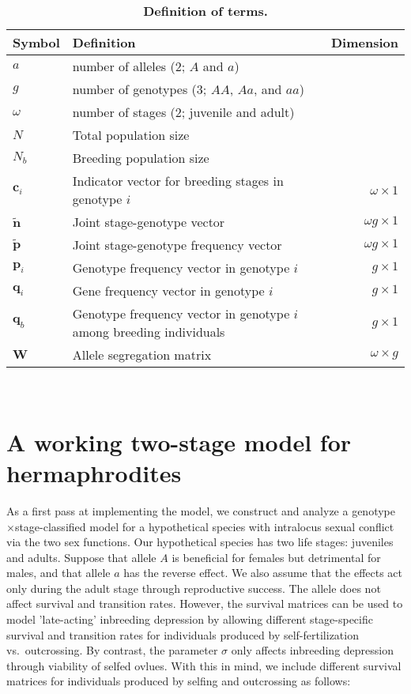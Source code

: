 \documentclass[11pt]{article}
\def\mbf#1{\mathbf{#1}}
\begin{document}
\begin{table}[htbp]
\centering
\caption{\bf Definition of terms.}
\begin{tabular}{ l l r }
 \toprule
	Symbol & Definition & Dimension \\
\hline
$a$      & number of alleles ($2$; $A$ and $a$) & \\
$g$      & number of genotypes ($3$; $AA$, $Aa$, and $aa$) & \\
$\omega$ & number of stages ($2$; juvenile and adult) & \\
$N$      & Total population size & \\
$N_b$    & Breeding population size & \\
$\mbf{c}_i$ & Indicator vector for breeding stages in genotype $i$ & $\omega \times 1$ \\
$\tilde{\mbf{n}}$ & Joint stage-genotype vector & $\omega g \times 1$ \\
$\tilde{\mbf{p}}$ & Joint stage-genotype frequency vector & $\omega g \times 1$ \\
$\mbf{p}_i$ & Genotype frequency vector in genotype $i$ & $g \times 1$ \\
$\mbf{q}_i$ & Gene frequency vector in genotype $i$ & $g \times 1$ \\
$\mbf{q}_b$ & Genotype frequency vector in genotype $i$ among breeding individuals & $g \times 1$ \\
$\mbf{W}$   & Allele segregation matrix & $\omega \times g$ \\
\hline
\end{tabular}
\label{tab:Definitions}\\
\end{table}
\newpage{}





\section*{A working two-stage model for hermaphrodites}
\setcounter{equation}{0}

As a first pass at implementing the model, we construct and analyze a genotype $\times$stage-classified model for a hypothetical species with intralocus sexual conflict via the two sex functions. Our hypothetical species has two life stages: juveniles and adults. Suppose that allele $A$ is beneficial for females but detrimental for males, and that allele $a$ has the reverse effect. We also assume that the effects act only during the adult stage through reproductive success. The allele does not affect survival and transition rates. However, the survival matrices can be used to model 'late-acting' inbreeding depression by allowing different stage-specific survival and transition rates for individuals produced by self-fertilization vs.~outcrossing. By contrast, the parameter $\sigma$ only affects inbreeding depression through viability of selfed ovlues. With this in mind, we include different survival matrices for individuals produced by selfing and outcrossing as follows:
\end{document}
